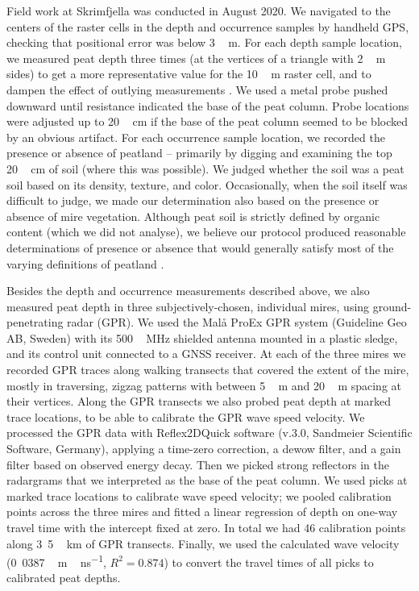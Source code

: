 \documentclass[soil, manuscript]{copernicus}
\begin{document}
Field work at Skrimfjella was conducted in August 2020.
We navigated to the centers of the raster cells in the depth and occurrence samples by handheld GPS, checking that positional error was below \unit{3\,m}.
For each depth sample location, we measured peat depth three times (at the vertices of a triangle with \unit{2\,m} sides) to get a more representative value for the \unit{10\,m} raster cell, and to dampen the effect of outlying measurements \citep{parryEvaluatingApproachesEstimating2014}.
We used a metal probe pushed downward until resistance indicated the base of the peat column.
Probe locations were adjusted up to \unit{20\,cm} if the base of the peat column seemed to be blocked by an obvious artifact.
For each occurrence sample location, we recorded the presence or absence of peatland -- primarily by digging and examining the top \unit{20\,cm} of soil (where this was possible).
We judged whether the soil was a peat soil based on its density, texture, and color.
Occasionally, when the soil itself was difficult to judge, we made our determination also based on the presence or absence of mire vegetation.
Although peat soil is strictly defined by organic content (which we did not analyse), we believe our protocol produced reasonable determinations of presence or absence that would generally satisfy most of the varying definitions of peatland \citep{minasnyMappingMonitoringPeatland2023}.

Besides the depth and occurrence measurements described above, we also measured peat depth in three subjectively-chosen, individual mires, using ground-penetrating radar (GPR).
We used the Malå ProEx GPR system (Guideline Geo AB, Sweden) with its \unit{500\,MHz} shielded antenna mounted in a plastic sledge, and its control unit connected to a GNSS receiver.
At each of the three mires we recorded GPR traces along walking transects that covered the extent of the mire, mostly in traversing, zigzag patterns with between \unit{5\,m} and \unit{20\,m} spacing at their vertices.
Along the GPR transects we also probed peat depth at marked trace locations, to be able to calibrate the GPR wave speed velocity.
We processed the GPR data with Reflex2DQuick software (v.3.0, Sandmeier Scientific Software, Germany), applying a time-zero correction, a dewow filter, and a gain filter based on observed energy decay.
Then we picked strong reflectors in the radargrams that we interpreted as the base of the peat column.
We used picks at marked trace locations to calibrate wave speed velocity; we pooled calibration points across the three mires and fitted a linear regression of depth on one-way travel time with the intercept fixed at zero.
In total we had 46 calibration points along \unit{3.5\,km} of GPR transects.
Finally, we used the calculated wave velocity (\unit{0.0387\,m\,ns^{-1}}, \(R^2 = 0.874\)) to convert the travel times of all picks to calibrated peat depths.
\end{document}
